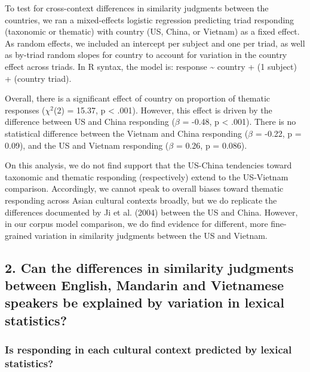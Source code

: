\documentclass[10pt, letterpaper]{article}
\begin{document}
To test for cross-context differences in similarity judgments between
the countries, we ran a mixed-effects logistic regression predicting
triad responding (taxonomic or thematic) with country (US, China, or
Vietnam) as a fixed effect. As random effects, we included an intercept
per subject and one per triad, as well as by-triad random slopes for
country to account for variation in the country effect across triads. In
R syntax, the model is: response \textasciitilde{} country + (1
\textbar{} subject) + (country \textbar{} triad).

Overall, there is a significant effect of country on proportion of
thematic responses (\(\chi^2\)(2) = 15.37, p \textless{} .001). However,
this effect is driven by the difference between US and China responding
(\(\beta\) = -0.48, p \textless{} .001). There is no statistical
difference between the Vietnam and China responding (\(\beta\) = -0.22,
p = 0.09), and the US and Vietnam responding (\(\beta\) = 0.26, p =
0.086).

On this analysis, we do not find support that the US-China tendencies
toward taxonomic and thematic responding (respectively) extend to the
US-Vietnam comparison. Accordingly, we cannot speak to overall biases
toward thematic responding across Asian cultural contexts broadly, but
we do replicate the differences documented by Ji et al. (2004) between
the US and China. However, in our corpus model comparison, we do find
evidence for different, more fine-grained variation in similarity
judgments between the US and Vietnam.

\hypertarget{can-the-differences-in-similarity-judgments-between-english-mandarin-and-vietnamese-speakers-be-explained-by-variation-in-lexical-statistics}{%
\subsection{2. Can the differences in similarity judgments between
English, Mandarin and Vietnamese speakers be explained by variation in
lexical
statistics?}\label{can-the-differences-in-similarity-judgments-between-english-mandarin-and-vietnamese-speakers-be-explained-by-variation-in-lexical-statistics}}

\hypertarget{is-responding-in-each-cultural-context-predicted-by-lexical-statistics}{%
\subsubsection{Is responding in each cultural context predicted by
lexical
statistics?}\label{is-responding-in-each-cultural-context-predicted-by-lexical-statistics}}
\end{document}
